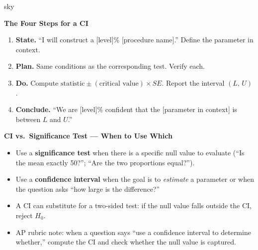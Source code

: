 \documentclass[10pt]{article}
\begin{document}
\begin{skillbox}{sky}
\begin{minipage}[t]{0.46\linewidth}
    \textbf{The Four Steps for a CI}
    \begin{enumerate}
        \item \textbf{State.} ``I will construct a [level]\% [procedure name].''
              Define the parameter in context.
        \item \textbf{Plan.} Same conditions as the corresponding test. Verify each.
        \item \textbf{Do.} Compute $\text{statistic} \pm (\text{critical value}) \times SE$.
              Report the interval $(L,\, U)$.
        \item \textbf{Conclude.} ``We are [level]\% confident that the [parameter in context]
              is between $L$ and $U$.''
    \end{enumerate}
\end{minipage}
\hfill
\begin{minipage}[t]{0.50\linewidth}
    \textbf{CI vs.\ Significance Test --- When to Use Which}
    \begin{itemize}
        \item Use a \textbf{significance test} when there is a specific null value to evaluate
              (``Is the mean exactly 50?''; ``Are the two proportions equal?'').
        \item Use a \textbf{confidence interval} when the goal is to \emph{estimate} a parameter
              or when the question asks ``how large is the difference?''
        \item A CI can substitute for a two-sided test: if the null value falls outside the CI,
              reject $H_0$.
        \item AP rubric note: when a question says ``use a confidence interval to determine
              whether,'' compute the CI and check whether the null value is captured.
    \end{itemize}
\end{minipage}
\end{skillbox}
\end{document}
